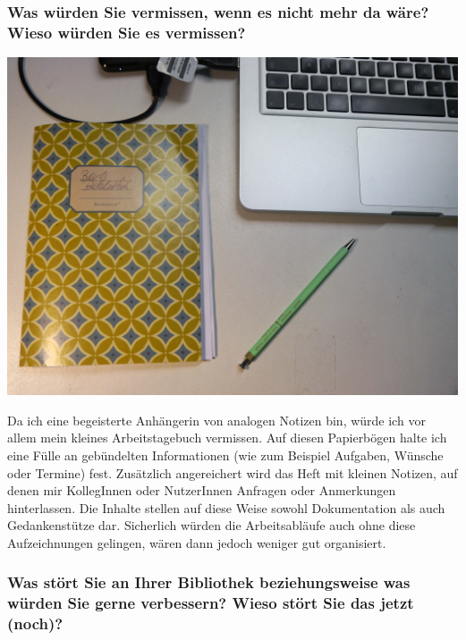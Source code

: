 \hypertarget{was-wuxfcrden-sie-vermissen-wenn-es-nicht-mehr-da-wuxe4re-wieso-wuxfcrden-sie-es-vermissen}{%
\subsubsection{Was würden Sie vermissen, wenn es nicht mehr da wäre? Wieso
würden Sie es
vermissen?}\label{was-wuxfcrden-sie-vermissen-wenn-es-nicht-mehr-da-wuxe4re-wieso-wuxfcrden-sie-es-vermissen}}

\begin{center}
\includegraphics{bwg-cluster/img/Notizheftchen.jpg}
\end{center}

Da ich eine begeisterte Anhängerin von analogen Notizen bin, würde ich
vor allem mein kleines Arbeitstagebuch vermissen. Auf diesen Papierbögen
halte ich eine Fülle an gebündelten Informationen (wie zum Beispiel
Aufgaben, Wünsche oder Termine) fest. Zusätzlich angereichert wird das
Heft mit kleinen Notizen, auf denen mir KollegInnen oder NutzerInnen
Anfragen oder Anmerkungen hinterlassen. Die Inhalte stellen auf diese
Weise sowohl Dokumentation als auch Gedankenstütze dar. Sicherlich
würden die Arbeitsabläufe auch ohne diese Aufzeichnungen gelingen, wären
dann jedoch weniger gut organisiert.

\hypertarget{was-stuxf6rt-sie-an-ihrer-bibliothek-beziehungsweise-was-wuxfcrden-sie-gerne-verbessern-wieso-stuxf6rt-sie-das-jetzt-noch}{%
\subsubsection{Was stört Sie an Ihrer Bibliothek beziehungsweise was würden
Sie gerne verbessern? Wieso stört Sie das jetzt
(noch)?}\label{was-stuxf6rt-sie-an-ihrer-bibliothek-beziehungsweise-was-wuxfcrden-sie-gerne-verbessern-wieso-stuxf6rt-sie-das-jetzt-noch}}

